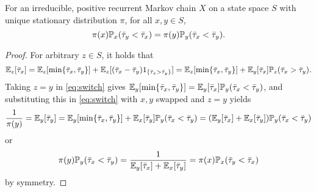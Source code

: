 \begin{prop}\label{thm:balance}
For an irreducible, positive recurrent Markov chain $X$ on a state space $S$ with unique stationary distribution $\pi$, for all $x,y\in S$,
\begin{equation*}
\pi(x)\mathbb{P}_x(\bar{\tau}_y<\bar{\tau}_x) = \pi(y)\mathbb{P}_y(\bar{\tau}_x<\bar{\tau}_y).
\end{equation*}
\end{prop}

\begin{proof}
For arbitrary $z\in S$, it holds that
\begin{equation}\label{eq:switch}
\mathbb{E}_{z}[\bar{\tau}_x] = \mathbb{E}_{z}[\min\{\bar{\tau}_x,\bar{\tau}_y\}] + \mathbb{E}_{z}[(\bar{\tau}_x - \bar{\tau}_y)1_{\{\bar{\tau}_x > \bar{\tau}_y\}}] = \mathbb{E}_{z}[\min\{\bar{\tau}_x,\bar{\tau}_y\}] + \mathbb{E}_{y}[\bar{\tau}_x] \mathbb{P}_z(\bar{\tau}_x>\bar{\tau}_y).
\end{equation}
Taking $z=y$ in \eqref{eq:switch} gives $\mathbb{E}_{y}[\min\{\bar{\tau}_x,\bar{\tau}_y\}] = \mathbb{E}_{y}[\bar{\tau}_x] \mathbb{P}_y(\bar{\tau}_x<\bar{\tau}_y)$, and substituting this in \eqref{eq:switch} with $x,y$ swapped and $z=y$ yields
\begin{align*}
\frac{1}{\pi(y)} = \mathbb{E}_{y}[\bar{\tau}_y] = \mathbb{E}_{y}[\min\{\bar{\tau}_x,\bar{\tau}_y\}] + \mathbb{E}_{x}[\bar{\tau}_y] \mathbb{P}_y(\bar{\tau}_x<\bar{\tau}_y) = (\mathbb{E}_{y}[\bar{\tau}_x] + \mathbb{E}_{x}[\bar{\tau}_y]) \mathbb{P}_y(\bar{\tau}_x<\bar{\tau}_y)
\end{align*}
or
\begin{equation}\label{eq:eyxexy}
\pi(y)\mathbb{P}_y(\bar{\tau}_x<\bar{\tau}_y) = \frac{1}{\mathbb{E}_{y}[\bar{\tau}_x] + \mathbb{E}_{x}[\bar{\tau}_y]} = \pi(x)\mathbb{P}_x(\bar{\tau}_y<\bar{\tau}_x)
\end{equation}
by symmetry.
\end{proof}


